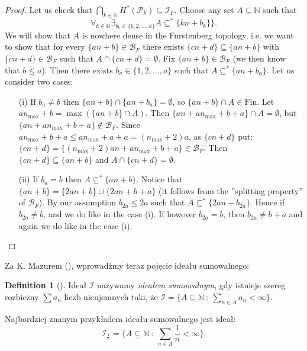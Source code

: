 \documentclass{amsart}
\theoremstyle{definition}
\newtheorem{problem}{Problem}
\newtheorem{df}{Definition}
\theoremstyle{definition}
\newcommand{\N}{{\mathbb N}}
\newcommand{\R}{{\mathbb R}}
\newcommand{\Fin}{\textrm{Fin}}
\newcommand{\I}{\mathcal I}
\DeclareMathOperator{\Exists}{\exists}
\DeclareMathOperator{\Forall}{\forall}
\begin{document}
\begin{proof}
Let us check that $\bigcap_{k\in\N} H^{*}(\mathcal{P}_k)\subseteq\I_F$. 
Choose any set $A\subseteq\N$ such that 
$$\Forall_{k\in\N}\Exists_{b_k\in\{1,2,\ldots,k\}} A\subseteq^* \{kn+b_k\}\}.$$ 
We will show that $A$ is nowhere dense in the Furstenberg 
topology, i.e. we want to show that for every $\{an+b\}\in \mathcal{B}_F$ there exists $\{cn+d\}\subseteq \{an+b\}$ with $\{cn+d\}\in \mathcal{B}_F$ such that $A\cap \{cn+d\} = \emptyset$. Fix $\{an+b\}\in \mathcal{B}_F$ (we then know that $b\leq a$). Then there exists $b_a\in\{1,2,\ldots,a\}$ 
such that $A\subseteq^* \{an+b_a\}$. Let us consider two cases:
\begin{itemize}
	\item[(i)] If $b_a\neq b$ then $\{an+b\} \cap \{an+b_a\} = \emptyset$, so $\{an+b\}\cap A \in\Fin$. Let  $an_{\textrm{max}}+b=\max(\{an+b\}\cap A)$. Then $\{an+an_{\max}+b+a\} \cap A = \emptyset$, but $\{an+an_{\max}+b+a\}\notin \mathcal{B}_F$. Since $an_{\max}+b+a \leq an_{\max}+a+a = (n_{\max}+2)a$, as $\{cn+d\}$ put: $\{cn+d\} = \{(n_{\max}+2)an+an_{\max}+b+a\}\in \mathcal{B}_F$. Then $\{cn+d\}\subseteq \{an+b\}$ and $A\cap \{cn+d\} = \emptyset$.
	\item[(ii)] If $b_a = b$ then $A\subseteq^* \{an+b\}$. Notice that $\{an+b\}=\{2an+b\}\cup \{2an+b+a\}$ (it follows from the ''splitting property'' of $\mathcal{B}_F$). 
By our assumption $b_{2a}\leq 2a$ such that $A\subseteq^* \{2an+b_{2a}\}$. Hence if $b_{2a} \neq b$, and 
we do like in the case (i). If however $b_{2a}=b$, then $b_{2a}\neq b+a$ and again we do like in the case (i).
\end{itemize}

\end{proof}


Za K. Mazurem (\cite{Maz}), wprowadźmy teraz pojęcie ideału sumowalnego:
\begin{df}[\cite{Maz}]
Ideał $\I$ nazywamy \emph{ideałem sumowalnym}, gdy istnieje szereg rozbieżny $\sum{a_n}$ liczb nieujemnych taki, że $\I=\{A\subseteq \N\ :\ \sum_{n\in A} a_n <\infty\}$.
\end{df}
Najbardziej znanym przykładem ideału sumowalnego jest ideał: 
$$\I_{\frac{1}{n}} = \{A\subseteq \N\ :\ \sum_{n\in A} \frac{1}{n} <\infty\}.$$
\end{document}
